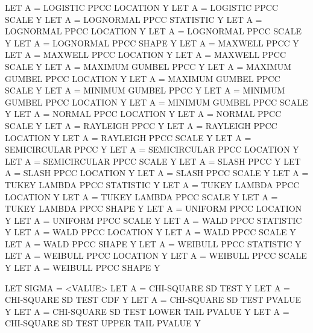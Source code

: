 {          LET A = LOGISTIC PPCC LOCATION            Y
          LET A = LOGISTIC PPCC SCALE               Y
          LET A = LOGNORMAL PPCC STATISTIC          Y
          LET A = LOGNORMAL PPCC LOCATION           Y
          LET A = LOGNORMAL PPCC SCALE              Y
          LET A = LOGNORMAL PPCC SHAPE              Y
          LET A = MAXWELL PPCC                      Y
          LET A = MAXWELL PPCC LOCATION             Y
          LET A = MAXWELL PPCC SCALE                Y
          LET A = MAXIMUM GUMBEL PPCC               Y
          LET A = MAXIMUM GUMBEL PPCC LOCATION      Y
          LET A = MAXIMUM GUMBEL PPCC SCALE         Y
          LET A = MINIMUM GUMBEL PPCC               Y
          LET A = MINIMUM GUMBEL PPCC LOCATION      Y
          LET A = MINIMUM GUMBEL PPCC SCALE         Y
          LET A = NORMAL PPCC LOCATION              Y
          LET A = NORMAL PPCC SCALE                 Y
          LET A = RAYLEIGH PPCC                     Y
          LET A = RAYLEIGH PPCC LOCATION            Y
          LET A = RAYLEIGH PPCC SCALE               Y
          LET A = SEMICIRCULAR PPCC                 Y
          LET A = SEMICIRCULAR PPCC LOCATION        Y
          LET A = SEMICIRCULAR PPCC SCALE           Y
          LET A = SLASH PPCC                        Y
          LET A = SLASH PPCC LOCATION               Y
          LET A = SLASH PPCC SCALE                  Y
          LET A = TUKEY LAMBDA PPCC STATISTIC       Y
          LET A = TUKEY LAMBDA PPCC LOCATION        Y
          LET A = TUKEY LAMBDA PPCC SCALE           Y
          LET A = TUKEY LAMBDA PPCC SHAPE           Y
          LET A = UNIFORM PPCC LOCATION             Y
          LET A = UNIFORM PPCC SCALE                Y
          LET A = WALD PPCC STATISTIC               Y
          LET A = WALD PPCC LOCATION                Y
          LET A = WALD PPCC SCALE                   Y
          LET A = WALD PPCC SHAPE                   Y
          LET A = WEIBULL PPCC STATISTIC            Y
          LET A = WEIBULL PPCC LOCATION             Y
          LET A = WEIBULL PPCC SCALE                Y
          LET A = WEIBULL PPCC SHAPE                Y

          LET SIGMA = <VALUE>
          LET A = CHI-SQUARE SD TEST                                 Y
          LET A = CHI-SQUARE SD TEST CDF                             Y
          LET A = CHI-SQUARE SD TEST PVALUE                          Y
          LET A = CHI-SQUARE SD TEST LOWER TAIL PVALUE               Y
          LET A = CHI-SQUARE SD TEST UPPER TAIL PVALUE               Y

}
